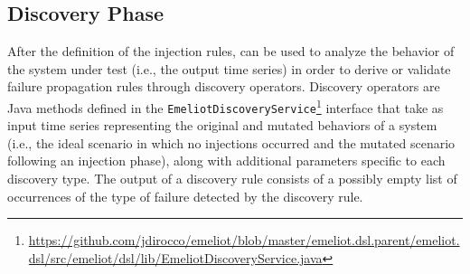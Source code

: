 \subsection{Discovery Phase}
\label{sec:discovery}
After the definition of the injection rules, \tool can be used to analyze the behavior of the system under test (i.e., the output time series) in order to derive or validate failure propagation rules through discovery operators. 
Discovery operators are Java methods defined in the \texttt{EmeliotDiscoveryService}\footnote{\url{https://github.com/jdirocco/emeliot/blob/master/emeliot.dsl.parent/emeliot.dsl/src/emeliot/dsl/lib/EmeliotDiscoveryService.java}} interface that take as input time series representing the original and mutated behaviors of a system (i.e., the ideal scenario in which no injections occurred and the mutated scenario following an injection phase), along with additional parameters specific to each discovery type. The output of a discovery rule consists of a possibly empty list of occurrences of the type of failure detected by the discovery rule. %


